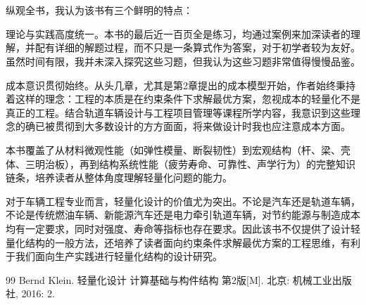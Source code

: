 \documentclass[12pt, oneside, a4paper]{ctexart}
\begin{document}
\section{}
\par{}
纵观全书，我认为该书有三个鲜明的特点：
\par{}
理论与实践高度统一。本书的最后近一百页全是练习，均通过案例来加深读者的理解，并配有详细的解题过程，而不只是一条算式作为答案，对于初学者较为友好。虽然时间有限，我并未深入探究这些习题，但我认为这些习题非常值得慢慢品鉴。
\par{}
成本意识贯彻始终。从头几章，尤其是第2章提出的成本模型开始，作者始终秉持着这样的理念：工程的本质是在约束条件下求解最优方案，忽视成本的轻量化不是真正的工程。结合轨道车辆设计与工程项目管理等课程所学内容，我意识到这些理念的确已被贯彻到大多数设计的方方面面，将来做设计时我也应注意成本方面。
\par{}
本书覆盖了从材料微观性能（如弹性模量、断裂韧性）到宏观结构（杆、梁、壳体、三明治板），再到结构系统性能（疲劳寿命、可靠性、声学行为）的完整知识链条，培养读者从整体角度理解轻量化问题的能力。
\par{}
对于车辆工程专业而言，轻量化设计的价值尤为突出。不论是汽车还是轨道车辆，不论是传统燃油车辆、新能源汽车还是电力牵引轨道车辆，对节约能源与制造成本均有一定要求，同时对强度、寿命等指标也存在要求。因此该书不仅提供了设计轻量化结构的一般方法，还培养了读者面向约束条件求解最优方案的工程思维，有利于我们面向生产实践进行轻量化结构的设计研究。
\par{}
\quad{}
\par{}
\begin{flushleft}
    \begin{small}
        \begin{thebibliography}{99}
            Bernd Klein. 轻量化设计  计算基础与构件结构  第2版[M]. 北京: 机械工业出版社, 2016: 2.
            \vspace{-3mm}
        \end{thebibliography}
    \end{small}
\end{flushleft}
\end{document}

